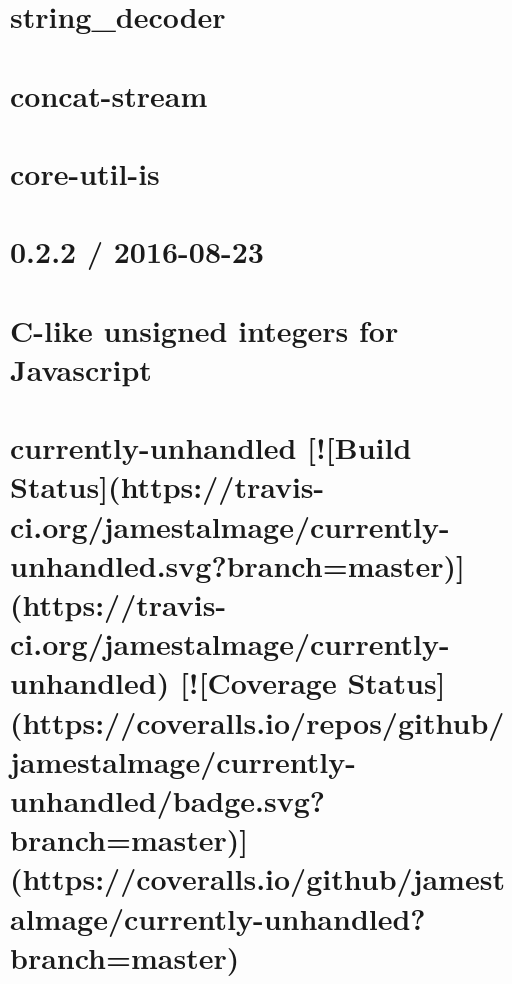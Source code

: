\documentclass[twoside]{book}
\newcommand{\+}{\discretionary{\mbox{\scriptsize$\hookleftarrow$}}{}{}}
\begin{document}
\chapter{string\+\_\+decoder}
\label{md_dsmacc_vis_degree_node_modules_concat-stream_node_modules_string_decoder_README}

\chapter{concat-\/stream}
\label{md_dsmacc_vis_degree_node_modules_concat-stream_readme}

\chapter{core-\/util-\/is}
\label{md_dsmacc_vis_degree_node_modules_core-util-is_README}

\chapter{0.2.2 / 2016-\/08-\/23}
\label{md_dsmacc_vis_degree_node_modules_cuint_History}

\chapter{C-\/like unsigned integers for Javascript}
\label{md_dsmacc_vis_degree_node_modules_cuint_README}

\chapter{currently-\/unhandled \mbox{[}!\mbox{[}Build Status\mbox{]}(https\+://travis-\/ci.org/jamestalmage/currently-\/unhandled.svg?branch=master)\mbox{]}(https\+://travis-\/ci.org/jamestalmage/currently-\/unhandled) \mbox{[}!\mbox{[}Coverage Status\mbox{]}(https\+://coveralls.io/repos/github/jamestalmage/currently-\/unhandled/badge.svg?branch=master)\mbox{]}(https\+://coveralls.io/github/jamestalmage/currently-\/unhandled?branch=master)}
\label{md_dsmacc_vis_degree_node_modules_currently-unhandled_readme}

\end{document}
